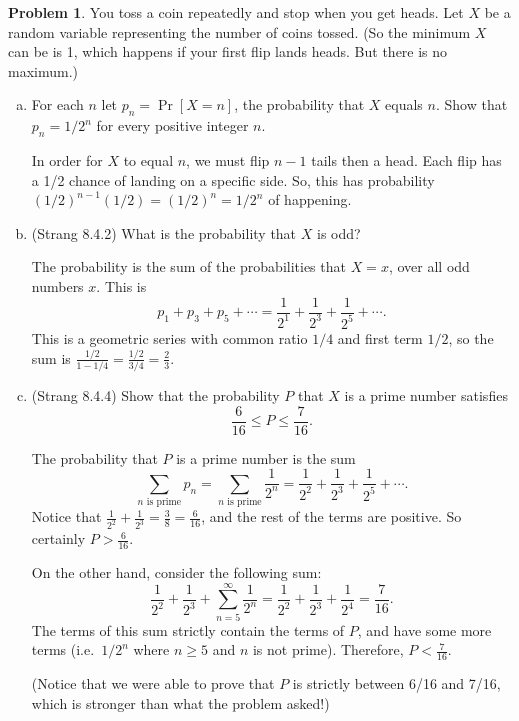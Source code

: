 \documentclass[11pt,oneside]{amsart}
\theoremstyle{definition}
\newtheorem{problem}{Problem}
\begin{document}
    \begin{problem}
        You toss a coin repeatedly and stop when you get heads. Let $X$ be a random variable representing the number of coins tossed. (So the minimum $X$ can be is 1, which happens if your first flip lands heads. But there is no maximum.)
        \begin{enumerate}[(a)]
            \item For each $n$ let $p_n=\Pr[X=n]$, the probability that $X$ equals $n$. Show that $p_n=1/2^n$ for every positive integer $n$.
            \begin{solution}
                In order for $X$ to equal $n$, we must flip $n-1$ tails then a head. Each flip has a 1/2 chance of landing on a specific side. So, this has probability $(1/2)^{n-1}(1/2)=(1/2)^n=1/2^n$ of happening.
            \end{solution}
            \item (Strang 8.4.2) What is the probability that $X$ is odd?
            \begin{solution}
                The probability is the sum of the probabilities that $X=x$, over all odd numbers $x$. This is
                \[p_1+p_3+p_5+\cdots=\frac 1{2^1}+\frac 1{2^3}+\frac 1{2^5}+\cdots.\]
                This is a geometric series with common ratio $1/4$ and first term $1/2$, so the sum is $\frac{1/2}{1- 1/4}=\frac {1/2}{3/4}=\frac 23$.
            \end{solution}
            \item (Strang 8.4.4) Show that the probability $P$ that $X$ is a prime number satisfies
            \[\frac 6{16}\leq P\leq \frac 7{16}.\]
            \begin{solution}
                The probability that $P$ is a prime number is the sum
                \[\sum_{n\text{ is prime}}p_n=\sum_{n\text{ is prime}}\frac 1{2^n}=\frac 1{2^2}+\frac 1{2^3}+\frac 1{2^5}+\cdots.\]
                Notice that $\frac 1{2^2}+\frac 1{2^3}=\frac 38=\frac 6{16}$, and the rest of the terms are positive. So certainly $P>\frac 6{16}$.

                On the other hand, consider the following sum:
                \[\frac 1{2^2}+\frac 1{2^3}+\sum_{n=5}^\infty\frac 1{2^n}=\frac 1{2^2}+\frac 1{2^3}+\frac 1{2^4}=\frac 7{16}.\]
                The terms of this sum strictly contain the terms of $P$, and have some more terms (i.e.\ $1/2^n$ where $n\geq 5$ and $n$ is not prime). Therefore, $P<\frac 7{16}$.

                (Notice that we were able to prove that $P$ is strictly between 6/16 and 7/16, which is stronger than what the problem asked!)


\end{solution}
\end{enumerate}
\end{problem}
\end{document}

